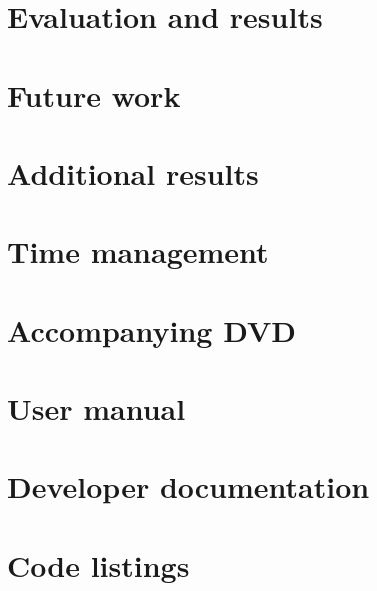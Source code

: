 \documentclass[a4paper,11pt]{report}
\begin{document}
\chapter{Evaluation and results}

\clearpage
\clearpage


\chapter{Future work}



\newpage


\newpage
\appendix

\chapter{Additional results}


\chapter{Time management}


\chapter{Accompanying DVD}


\chapter{User manual}


\chapter{Developer documentation}


\chapter{Code listings}

\end{document}
